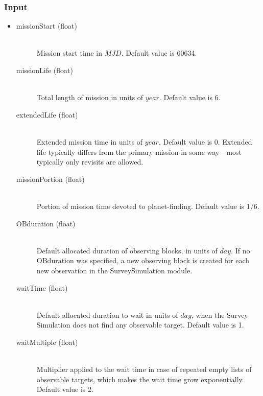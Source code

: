 \documentclass[cleanfoot]{asme2ej}
\begin{document}
\subsubsection*{Input}
\begin{itemize}
\item
\begin{description}
    \item[missionStart (float)] \hfill \\ Mission start time in $ MJD $. Default value is 60634.
    \item[missionLife (float)] \hfill \\ Total length of mission in units of $ year $. Default value is 6.
    \item[extendedLife (float)] \hfill \\ Extended mission time in units of $ year $. Default value is 0.  Extended life typically differs from the primary mission in some way---most typically only revisits are allowed.
    \item[missionPortion (float)] \hfill \\ Portion of mission time devoted to planet-finding. Default value is 1/6.
    \item[OBduration (float)] \hfill \\ Default allocated duration of observing blocks, in units of $day$. If no OBduration was specified, a new observing block is created for each new observation in the SurveySimulation module.
    \item[waitTime (float)] \hfill \\ Default allocated duration to wait in units of $day$, when the Survey Simulation does not find any observable target. Default value is 1.
    \item[waitMultiple (float)] \hfill \\ Multiplier applied to the wait time in case of repeated empty lists of observable targets, which makes the wait time grow exponentially. Default value is 2.
\end{description}
\end{itemize}
\end{document}
